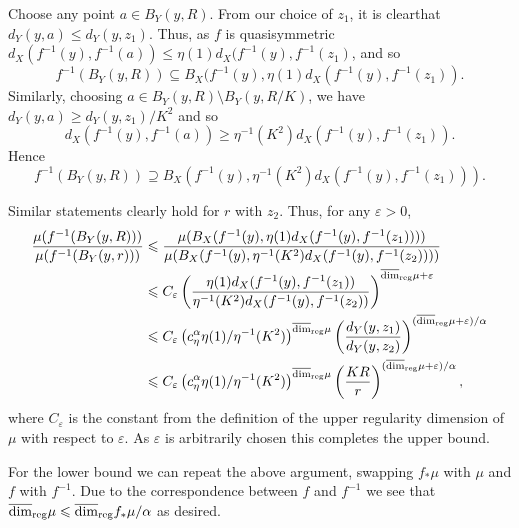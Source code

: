 	
Choose any point $a \in B_Y(y,R)$. From our choice of $z_1$, it is clearthat$d_Y( y , a ) \le d_Y(y , z_1)$. Thus, as $f$ is quasisymmetric $d_X( f^{-1}(y) , f^{-1}(a) ) \le \eta(1)  d_X(f^{-1}(y) , f^{-1}(z_1) $, and so 
	\[
f^{-1}(B_Y(y,R)) \subseteq B_X(f^{-1}(y),\eta(1)d_X(f^{-1}(y), f^{-1}(z_1)).
	\]
Similarly, choosing $a \in B_Y(y,R) \setminus B_Y(y,R/K)$, we have $d_Y( y , a ) \ge d_Y( y , z_1 )/K^2$ and so $$d_X( f^{-1}(y) , f^{-1}(a) ) \ge \eta^{-1}(K^2) d_X( f^{-1}(y) , f^{-1}(z_1) ).$$
Hence 
\[
f^{-1}(B_Y(y,R)) \supseteq B_X(f^{-1}(y),\eta^{-1}(K^2)d_X(f^{-1}(y),f^{-1}(z_1))).
\]
	
	
	
Similar statements clearly hold for $r$ with $z_2$. Thus, for any $\varepsilon > 0$,
\begin{align*}
\frac{\mu(f^{-1}(B_Y(y,R)))}{\mu(f^{-1}(B_Y(y,r)))} &\leqslant \frac{\mu(B_X(f^{-1}(y),\eta(1)d_X(f^{-1}(y), f^{-1}(z_1)) ))}{\mu(B_X(f^{-1}(y),\eta^{-1}(K^2)d_X(f^{-1}(y),f^{-1}(z_2)) ))} \\
& \leqslant C_{\varepsilon}\left( \frac{\eta(1)d_X(f^{-1}(y),f^{-1}(z_1))}{\eta^{-1}(K^2)d_X(f^{-1}(y),f^{-1}(z_2))}\right)^{\overline{\dim}_{\textup{reg}} \mu + \varepsilon} \\
& \leqslant C_{\varepsilon}\left(c_\eta^{\alpha} \eta(1)/\eta^{-1}(K^2)\right)^{\overline{\dim}_{\textup{reg}} \mu} \left(\frac{d_Y(y,z_1)}{d_Y(y,z_2)} \right)^{(\overline{\dim}_{\textup{reg}} \mu + \varepsilon)  / \alpha} \\
& \leqslant C_{\varepsilon}\left(c_\eta^{\alpha} \eta(1)/\eta^{-1}(K^2)\right)^{\overline{\dim}_{\textup{reg}} \mu} \left(\frac{KR}{r} \right)^{(\overline{\dim}_{\textup{reg}} \mu +\varepsilon)/ \alpha},
	\end{align*}
where $C_{\varepsilon}$ is the constant from the definition of the upper regularity dimension of $\mu$ with respect to $\varepsilon$. As $\varepsilon$ is arbitrarily chosen this completes the upper bound.
	
For the lower bound we can repeat the above argument, swapping $f_*\mu$ with $\mu$ and $f$ with $f^{-1}$. Due to the correspondence between $f$ and $f^{-1}$ we see that $\overline{\dim}_{\textup{reg}}  \mu \leqslant  \overline{\dim}_{\textup{reg}} f_* \mu / \alpha$ as desired.
	
